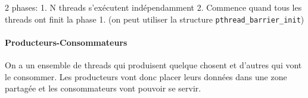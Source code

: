 2 phases: 1. N threads s'exécutent indépendamment 2. Commence quand tous
les threads ont finit la phase 1. (on peut utiliser la structure
\texttt{pthread\_barrier\_init})

\begin{Shaded}
\begin{Highlighting}[]
\OperatorTok{;} 
\OperatorTok{;} 
\OperatorTok{=}\OperatorTok{;} 

\OperatorTok{(\&}\OperatorTok{,}\OperatorTok{,}\OperatorTok{)}

\OperatorTok{();} 

\OperatorTok{(\&}\OperatorTok{);}\OperatorTok{++;} 
\OperatorTok{(}\OperatorTok{==}\OperatorTok{)} \OperatorTok{\{}
\OperatorTok{(\&}\OperatorTok{);}
\OperatorTok{\}}
\OperatorTok{(\&}\OperatorTok{);} 
\OperatorTok{(\&}\OperatorTok{);}
\OperatorTok{(\&}\OperatorTok{);}

\OperatorTok{();}
\end{Highlighting}
\end{Shaded}

\paragraph{Producteurs-Consommateurs}\label{producteurs-consommateurs}

On a un ensemble de threads qui produisent quelque chosent et d'autres
qui vont le consommer. Les producteurs vont donc placer leurs données
dans une zone partagée et les consommateurs vont pouvoir se servir.

